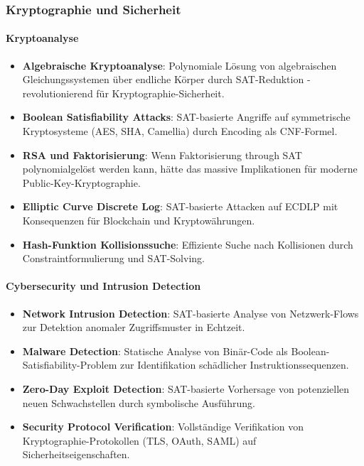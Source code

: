 ﻿\documentclass[a4paper,12pt]{article}
\theoremstyle{definition}
\begin{document}
\subsubsection{Kryptographie und Sicherheit}

\paragraph{Kryptoanalyse}

\begin{itemize}
	\item \textbf{Algebraische Kryptoanalyse}: Polynomiale Lösung von algebraischen Gleichungssystemen über endliche Körper durch SAT-Reduktion - revolutionierend für Kryptogra\-phie-Sicherheit.
	
	\item \textbf{Boolean Satisfiability Attacks}: SAT-basierte Angriffe auf symmetrische Kryptosysteme (AES, SHA, Camellia) durch Encoding als CNF-Formel.
	
	\item \textbf{RSA und Faktorisierung}: Wenn Faktorisierung through SAT polynomialgelöst werden kann, hätte das massive Implikationen für moderne Public-Key-Kryptographie.
	
	\item \textbf{Elliptic Curve Discrete Log}: SAT-basierte Attacken auf ECDLP mit Konsequenzen für Blockchain und Kryptowährungen.
	
	\item \textbf{Hash-Funktion Kollisionssuche}: Effiziente Suche nach Kollisionen durch Constraintformulierung und SAT-Solving.
\end{itemize}

\paragraph{Cybersecurity und Intrusion Detection}

\begin{itemize}
	\item \textbf{Network Intrusion Detection}: SAT-basierte Analyse von Netzwerk-Flows zur Detektion anomaler Zugriffsmuster in Echtzeit.
	
	\item \textbf{Malware Detection}: Statische Analyse von Binär-Code als Boolean-Satisfiability-Problem zur Identifikation schädlicher Instruktionssequenzen.
	
	\item \textbf{Zero-Day Exploit Detection}: SAT-basierte Vorhersage von potenziellen neuen Schwachstellen durch symbolische Ausführung.
	
	\item \textbf{Security Protocol Verification}: Vollständige Verifikation von Kryptographie-Protokollen (TLS, OAuth, SAML) auf Sicherheitseigenschaften.
\end{itemize}
\end{document}

